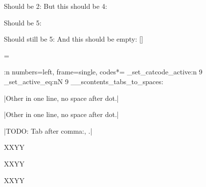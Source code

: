 \documentclass{article}
\begin{document}
\begin{scontents}
[store-env=nowhere]
\4
\end{scontents}
Should be 2: 
But this should be 4: 

\begin{scontents}%
[store-env=nowhere]
\5
\end{scontents}
Should be 5: 

\begin{scontents}%
\6
\end{scontents}
Should still be 5: 
And this should be empty: []

\interactionmode=\tmpa


\hrulefill

\makeatletter
\let\verbatimsc\@undefined
\let\endverbatimsc\@undefined
\makeatother
\ExplSyntaxOn
\use:n
  {
\ExplSyntaxOff
{}
  {
    numbers=left,
    frame=single,
    codes*=
      {
        \char_set_catcode_active:n { 9 }
        \char_set_active_eq:nN { 9 } \__scontents_tabs_to_spaces:
      }
  }
  }


\Scontents*[store-cmd=nospace]|Other in one line, no space after dot.|

\Scontents*[store-cmd=nospace]|Other	in	one	line,	no	space	after	dot.|

\Scontents*[store-cmd=nospace]|TODO: Tab after comma:,	.|

XXYY\par
XXYY\par
XXYY\par

\par
{}\par
{}\par
{}\par
{}\par
{}\par
{}\par
{}\par
\end{document}

